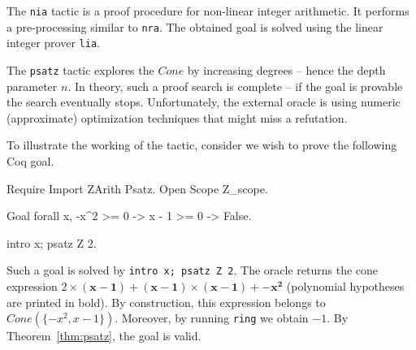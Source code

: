 \label{sec:nia}
The {\tt nia} tactic is a proof procedure for non-linear  integer arithmetic.
%
It performs a pre-processing similar to {\tt nra}. The obtained goal is solved using the linear integer prover {\tt lia}.

\label{sec:psatz}
The {\tt psatz} tactic explores the $\mathit{Cone}$ by increasing degrees -- hence the depth parameter $n$.
In theory, such a proof search is complete -- if the goal is provable the search eventually stops.
Unfortunately, the external oracle is using numeric (approximate) optimization techniques that might miss a
refutation.

To illustrate the working of the tactic, consider we wish to prove the following Coq goal.
\begin{coq_eval}
Require Import ZArith Psatz.
Open Scope Z_scope.
\end{coq_eval}
\begin{coq_example*}
Goal forall x, -x^2 >= 0 -> x - 1 >= 0 -> False.
\end{coq_example*}
\begin{coq_eval}
intro x; psatz Z 2.
\end{coq_eval}
Such a goal is solved by {\tt intro x; psatz Z 2}. The oracle returns the
cone expression $2 \times (\mathbf{x-1}) + (\mathbf{x-1}) \times
(\mathbf{x-1}) + \mathbf{-x^2}$ (polynomial hypotheses are printed in
bold). By construction, this expression belongs to $\mathit{Cone}(\{-x^2,
x -1\})$. Moreover, by running {\tt ring} we obtain $-1$. By
Theorem~\ref{thm:psatz}, the goal is valid.
%

%




